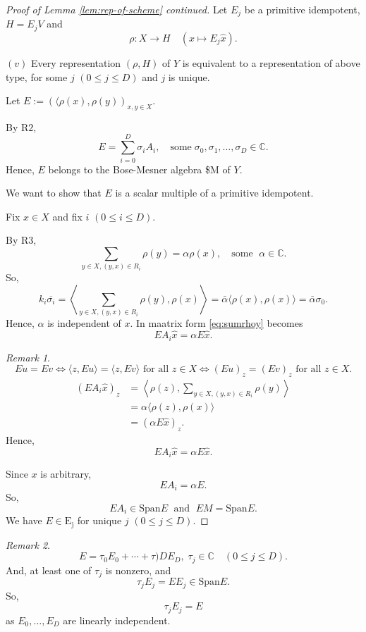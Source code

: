 \documentclass[
]{book}
\theoremstyle{definition}
\theoremstyle{definition}
\theoremstyle{definition}
\theoremstyle{definition}
\theoremstyle{remark}
\newtheorem*{remark}{Remark}
\begin{document}
\begin{proof}[Proof of Lemma \ref{lem:rep-of-scheme} continued]
Let \(E_j\) be a primitive idempotent, \(H = E_jV\) and
\[\rho: X\to H \quad (x\mapsto E_j\hat{x}).\]

\((v)\) Every representation \((\rho, H)\) of \(Y\) is equivalent to a representation of above type, for some \(j\) \((0\leq j\leq D)\) and \(j\) is unique.

Let \(E:=(\langle \rho(x), \rho(y))_{x,y\in X}\).

By \(\mathrm{R2}\),
\[E = \sum_{i = 0}^D \sigma_i A_i, \quad \text{some}\; \sigma_0, \sigma_1, \ldots, \sigma_D\in \mathbb{C}.\]
Hence, \(E\) belongs to the Bose-Mesner algebra \$M of \(Y\).

We want to show that \(E\) is a scalar multiple of a primitive idempotent.

Fix \(x\in X\) and fix \(i\) \((0\leq i\leq D)\).

By \(\mathrm{R3}\),
\begin{equation}
\sum_{y\in X, (y,x)\in R_i}\rho(y) = \alpha \rho(x), \quad \text{some }\; \alpha\in \mathbb{C}. \label{eq:sumrhoy}
\end{equation}
So,
\[k_i\overline{\sigma_i} = \left\langle \sum_{y\in X, (y,x)\in R_i}\rho(y),\rho(x)\right\rangle = \bar{\alpha}\langle \rho(x), \rho(x)\rangle = \bar{\alpha}\sigma_0.\]
Hence, \(\alpha\) is independent of \(x\). In maatrix form \eqref{eq:sumrhoy} becomes
\[EA_i\hat{x} = \alpha E\hat{x}.\]

\begin{remark}
\[Eu = Ev \Leftrightarrow \langle z, Eu\rangle = \langle z, Ev\rangle \text{ for all }z\in X \Leftrightarrow (Eu)_z = (Ev)_z \text{ for all }z\in X.\]
\begin{align}
(EA_i\hat{x})_z & = \left\langle \rho(z), \sum_{y\in X, (y,x)\in R_i}\rho(y)\right\rangle\\
& = \alpha \langle \rho(z), \rho(x)\rangle\\
& = (\alpha E\hat{x})_z.
\end{align}
Hence,
\[EA_i\hat{x} = \alpha E\hat{x}.\]
\end{remark}

Since \(x\) is arbitrary,
\[EA_i = \alpha E.\]
So,
\[EA_i \in \mathrm{Span} E\; \text{ and }\; EM = \mathrm{Span} E.\]
We have \(E\in \mathrm{E_j}\) for unique \(j\) \((0\leq j\leq D)\).
\end{proof}

\begin{remark}
\[E = \tau_0 E_0 + \cdots + \tau)D E_D, \; \tau_j\in \mathbb{C}\quad (0\leq j\leq D).\]
And, at least one of \(\tau_j\) is nonzero, and
\[\tau_jE_j = EE_j \in \mathrm{Span}E.\]
So,
\[\tau_jE_j = E\]
as \(E_0, \ldots, E_D\) are linearly independent.
\end{remark}
\end{document}
